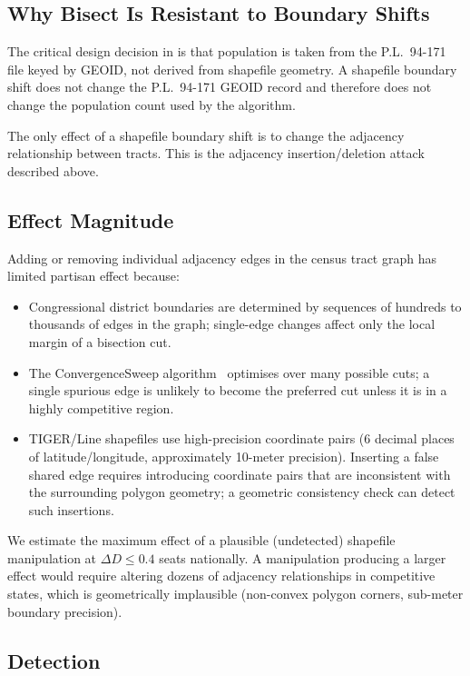 \subsection{Why Bisect Is Resistant to Boundary Shifts}

The critical design decision in \bisect{} is that population is taken from
the P.L.\ 94-171 file keyed by GEOID, not derived from shapefile geometry.
A shapefile boundary shift does not change the P.L.\ 94-171 GEOID record
and therefore does not change the population count used by the algorithm.

The only effect of a shapefile boundary shift is to change the adjacency
relationship between tracts.
This is the adjacency insertion/deletion attack described above.

\subsection{Effect Magnitude}

Adding or removing individual adjacency edges in the census tract graph
has limited partisan effect because:
\begin{itemize}
\item Congressional district boundaries are determined by sequences of
  hundreds to thousands of edges in the graph; single-edge changes
  affect only the local margin of a bisection cut.
\item The ConvergenceSweep algorithm~\citep{b16paper} optimises over
  many possible cuts; a single spurious edge is unlikely to become
  the preferred cut unless it is in a highly competitive region.
\item TIGER/Line shapefiles use high-precision coordinate pairs
  (6 decimal places of latitude/longitude, approximately 10-meter
  precision).
  Inserting a false shared edge requires introducing coordinate pairs
  that are inconsistent with the surrounding polygon geometry;
  a geometric consistency check can detect such insertions.
\end{itemize}

We estimate the maximum effect of a plausible (undetected) shapefile
manipulation at $\Delta D \leq 0.4$ seats nationally.
A manipulation producing a larger effect would require altering dozens of
adjacency relationships in competitive states, which is geometrically
implausible (non-convex polygon corners, sub-meter boundary precision).

\subsection{Detection}

